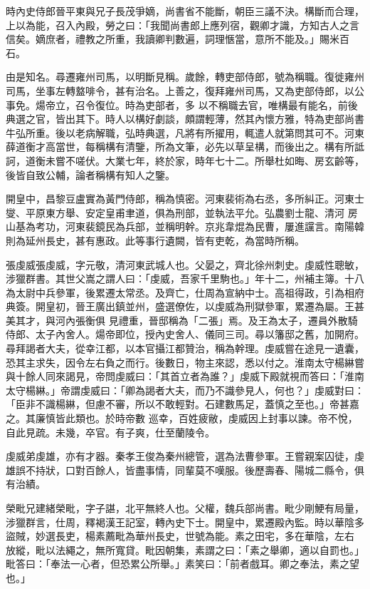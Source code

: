 \begin{pinyinscope}
 時內史侍郎晉平東與兄子長茂爭嫡，尚書省不能斷，朝臣三議不決。構斷而合理，上以為能，召入內殿，勞之曰：「我聞尚書郎上應列宿，觀卿才識，方知古人之言信矣。嫡庶者，禮教之所重，我讀卿判數遍，詞理愜當，意所不能及。」賜米百石。



 由是知名。尋遷雍州司馬，以明斷見稱。歲餘，轉吏部侍郎，號為稱職。復徙雍州司馬，坐事左轉盩啡令，甚有治名。上善之，復拜雍州司馬，又為吏部侍郎，以公事免。煬帝立，召令復位。時為吏部者，多
 以不稱職去官，唯構最有能名，前後典選之官，皆出其下。時人以構好劇談，頗謂輕薄，然其內懷方雅，特為吏部尚書牛弘所重。後以老病解職，弘時典選，凡將有所擢用，輒遣人就第問其可不。河東薛道衡才高當世，每稱構有清鑒，所為文筆，必先以草呈構，而後出之。構有所詆訶，道衡未嘗不嗟伏。大業七年，終於家，時年七十二。所舉杜如晦、房玄齡等，後皆自致公輔，論者稱構有知人之鑒。



 開皇中，昌黎豆盧實為黃門侍郎，稱為慎密。河東裴術為右丞，多所糾正。河東士燮、平原東方舉、安定皇甫聿道，俱為刑部，並執法平允。弘農劉士龍、清河
 房山基為考功，河東裴鏡民為兵部，並稱明幹。京兆韋焜為民曹，屢進讜言。南陽韓則為延州長史，甚有惠政。此等事行遺闕，皆有吏乾，為當時所稱。



 張虔威張虔威，字元敬，清河東武城人也。父晏之，齊北徐州刺史。虔威性聰敏，涉獵群書。其世父嵩之謂人曰：「虔威，吾家千里駒也。」年十二，州補主簿。十八為太尉中兵參軍，後累遷太常丞。及齊亡，仕周為宣納中士。高祖得政，引為相府典簽。開皇初，晉王廣出鎮並州，盛選僚佐，以虔威為刑獄參軍，累遷為屬。王甚美其才，與河內張衡俱
 見禮重，晉邸稱為「二張」焉。及王為太子，遷員外散騎侍郎、太子內舍人。煬帝即位，授內史舍人、儀同三司。尋以籓邸之舊，加開府。尋拜謁者大夫，從幸江都，以本官攝江都贊治，稱為幹理。虔威嘗在途見一遺囊，恐其主求失，因令左右負之而行。後數日，物主來認，悉以付之。淮南太守楊綝嘗與十餘人同來謁見，帝問虔威曰：「其首立者為誰？」虔威下殿就視而答曰：「淮南太守楊綝。」帝謂虔威曰：「卿為謁者大夫，而乃不識參見人，何也？」虔威對曰：「臣非不識楊綝，但慮不審，所以不敢輕對。石建數馬足，蓋慎之至也。」帝甚嘉之。其廉慎皆此類也。於時帝數
 巡幸，百姓疲敝，虔威因上封事以諫。帝不悅，自此見疏。未幾，卒官。有子爽，仕至蘭陵令。



 虔威弟虔雄，亦有才器。秦孝王俊為秦州總管，選為法曹參軍。王嘗親案囚徒，虔雄誤不持狀，口對百餘人，皆盡事情，同輩莫不嘆服。後歷壽春、陽城二縣令，俱有治績。



 榮毗兄建緒榮毗，字子諶，北平無終人也。父權，魏兵部尚書。毗少剛鯁有局量，涉獵群言，仕周，釋褐漢王記室，轉內史下士。開皇中，累遷殿內監。時以華陰多盜賊，妙選長吏，楊素薦毗為華州長史，世號為能。素之田宅，多在華陰，左右
 放縱，毗以法繩之，無所寬貸。毗因朝集，素謂之曰：「素之舉卿，適以自罰也。」毗答曰：「奉法一心者，但恐累公所舉。」素笑曰：「前者戲耳。卿之奉法，素之望也。」




\end{pinyinscope}
